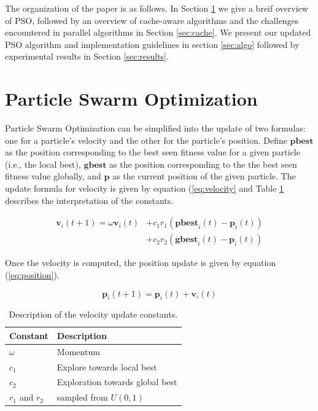 The organization of the paper is as follows. In Section \ref{sec:pso} we give a
breif overview of PSO, followed by an overview of cache-aware algorithms and the
challenges encountered in parallel algorithms in Section \ref{sec:cache}. We
present our updated PSO algorithm and implementation guidelines in section
\ref{sec:algo} followed by experimental results in Section \ref{sec:results}.

\section{Particle Swarm Optimization}\label{sec:pso}
Particle Swarm Optimization can be simplified into the update of two formulas:
one for a particle's velocity and the other for the particle's position. Define
$\textbf{pbest}$ as the position corresponding to the best seen fitness value
for a given particle (i.e., the local best), $\textbf{gbest}$ as the position
corresponding to the the best seen fitness value globally, and $\textbf{p}$ as
the current position of the given particle. The update formula for velocity is
given by equation (\ref{eq:velocity} and Table \ref{tab:constants} describes
the interpretation of the constants.

\begin{align}
  \textbf{v}_i(t+1) = \omega \textbf{v}_i (t) & +
                                                c_1 r_1 (\textbf{pbest}_i(t) -
                                                \textbf{p}_i(t))
  \\\label{eq:velocity}
  &+ c_2 r_2 (\textbf{gbest}_i(t) - \textbf{p}_i(t))\nonumber
\end{align}

Once the velocity is computed, the position update is given by equation
(\ref{eq:position}).

\begin{equation}\label{eq:position}
  \textbf{p}_i(t+1) = \textbf{p}_i(t) + \textbf{v}_i(t)
\end{equation}

\begin{table}
  \caption{Description of the velocity update constants.}\label{tab:constants}
  \begin{tabular}{ll}\toprule
  \textbf{Constant} & \textbf{Description}\\\midrule
  $\omega$ & Momentum\\
  $c_1$ & Explore towards local best\\
  $c_2$ & Exploration towards global best\\
  $r_1$ and $r_2$ & sampled from $U(0,1)$\\\bottomrule
  \end{tabular}
\end{table}

